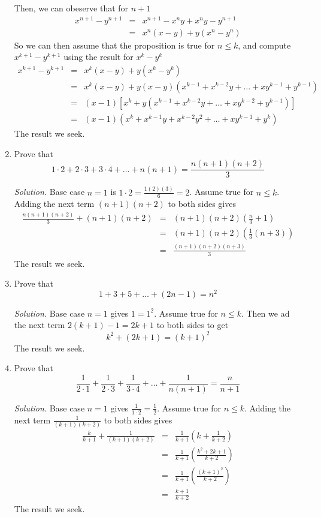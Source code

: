 \documentclass[12pt]{article}
\newcommand\sol[1]{\begin{mdframed}
\emph{Solution.} #1
\end{mdframed}}
\begin{document}
\begin{enumerate}
{      Then, we can obeserve that for $n+1$
      \begin{align*}
        x^{n+1} - y^{n+1} &=& x^{n+1} - x^ny + x^ny - y^{n+1} \\
        &=& x^n(x-y) + y(x^n-y^n)
      \end{align*}
      So we can then assume that the proposition is true for $n \le k$, and compute $x^{k+1}-y^{k+1}$ using the result for $x^k-y^k$
      \begin{align*}
        x^{k+1} - y^{k+1} &=& x^k(x-y) + y(x^k-y^k) \\
        &=& x^k(x-y) + y(x-y)(x^{k-1}+x^{k-2}y +\ldots+xy^{k-1} + y^{k-1}) \\
        &=& (x-1) [x^k + y(x^{k-1}+x^{k-2}y +\ldots+xy^{k-2} + y^{k-1})] \\
        &=& (x-1) (x^k + x^{k-1}y+x^{k-2}y^2 +\ldots+xy^{k-1} + y^{k}) 
      \end{align*}
      The result we seek.
    }

  \item Prove that
    \[
    1\cdot2 + 2\cdot3 + 3\cdot4 + \ldots+n(n+1) = \frac{n(n+1)(n+2)}{3}
    \]
    \sol{Base case $n=1$ is $1\cdot2 = \frac{1(2)(3)}{6} = 2$. Assume true for $n \le k$. Adding the next term $(n+1)(n+2)$ to both sides gives
      \begin{align*}
        \frac{n(n+1)(n+2)}{3} + (n+1)(n+2) &=& (n+1)(n+2)\left(\frac{n}{3} + 1\right) \\
        &=& (n+1)(n+2) \left(\frac{1}{3} (n+3)\right) \\
        &=& \frac{(n+1)(n+2)(n+3)}{3}
      \end{align*}
      The result we seek.}

  \item Prove that
    \[
    1+3+5+\ldots+(2n-1) = n^2
    \]
    \sol{Base case $n=1$ gives $1 = 1^2$. Assume true for $n \le k$. Then we ad the next term $2(k+1)-1 = 2k+1$ to both sides to get
      \[
      k^2 + (2k+1) = (k+1)^2
      \]
      The result we seek.
    }

  \item Prove that
    \[
    \frac{1}{2\cdot1} + \frac{1}{2\cdot3} + \frac{1}{3\cdot4} +\ldots+\frac{1}{n(n+1)} = \frac{n}{n+1}    
    \]
    \sol{Base case $n=1$ gives $\frac{1}{1\cdot 2} = \frac{1}{2}$. Assume true for $n \le k$. Adding the next term $\frac{1}{(k+1)(k+2)}$ to both sides gives
        \begin{align*}
          \frac{k}{k+1} + \frac{1}{(k+1)(k+2)} &=& \frac{1}{k+1} \left ( k + \frac{1}{k+2} \right) \\
          &=& \frac{1}{k+1} \left ( \frac{k^2 + 2k + 1}{k+2} \right) \\
          &=& \frac{1}{k+1} \left ( \frac{(k+ 1)^2}{k+2} \right) \\
          &=& \frac{k+ 1}{k+2}
        \end{align*}
        The result we seek.
    }


\end{enumerate}
\end{document}

